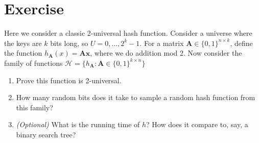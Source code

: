 \documentclass[14pt]{extreport}
\newcounter{counter}
\newcommand{\Exercise}{Exercise \stepcounter{counter}\thecounter}
\begin{document}
\section*{\Exercise}
    Here we consider a classic 2-universal hash function. Consider a universe where the keys are $k$ bits long, so $U = 0, \dots, 2^{k} - 1$. For a matrix $ \bm{A} \in \{0, 1\}^{n \times k} $, define the function $ h_{\bm{A}}(x) = \bm{A}\bm{x} $, where we do addition mod 2. Now consider the family of functions $ \mathcal{H} = \{h_{\bm{A}} : \bm{A} \in \{0, 1\}^{k \times n} \} $
    \begin{enumerate}
        \item Prove this function is 2-universal.
        \item How many random bits does it take to sample a random hash function from this family?
        \item \textit{(Optional)} What is the running time of $h$? How does it compare to, say, a binary search tree?
    \end{enumerate}
\end{document}
